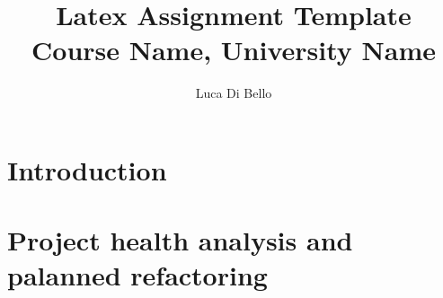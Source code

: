 \documentclass[a4paper, 11pt]{article}
\title{Latex Assignment Template\\\large Course Name, University Name}
\author{Luca Di Bello}
\date{\displaydate{today}}
\begin{document}
\maketitle

\section{Introduction}


\section{Project health analysis and palanned refactoring}


\nocite{*} %
\printbibliography
\end{document}
